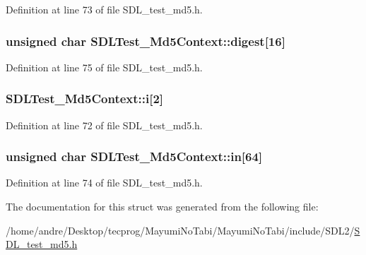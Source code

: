 Definition at line 73 of file S\-D\-L\-\_\-test\-\_\-md5.\-h.

\hypertarget{struct_s_d_l_test___md5_context_ab29079997a9f35e5d52c2aac3ad28f90}{
\subsubsection[{digest}]{\setlength{\rightskip}{0pt plus 5cm}unsigned char S\-D\-L\-Test\-\_\-\-Md5\-Context\-::digest\mbox{[}16\mbox{]}}}\label{struct_s_d_l_test___md5_context_ab29079997a9f35e5d52c2aac3ad28f90}


Definition at line 75 of file S\-D\-L\-\_\-test\-\_\-md5.\-h.

\hypertarget{struct_s_d_l_test___md5_context_a95b3d5fd74fd1b7a27bf96f3bb32beb4}{
\subsubsection[{i}]{ S\-D\-L\-Test\-\_\-\-Md5\-Context\-::i\mbox{[}2\mbox{]}}}\label{struct_s_d_l_test___md5_context_a95b3d5fd74fd1b7a27bf96f3bb32beb4}


Definition at line 72 of file S\-D\-L\-\_\-test\-\_\-md5.\-h.

\hypertarget{struct_s_d_l_test___md5_context_a337638ef799dc0ad9397ea9b175ea388}{
\subsubsection[{in}]{\setlength{\rightskip}{0pt plus 5cm}unsigned char S\-D\-L\-Test\-\_\-\-Md5\-Context\-::in\mbox{[}64\mbox{]}}}\label{struct_s_d_l_test___md5_context_a337638ef799dc0ad9397ea9b175ea388}


Definition at line 74 of file S\-D\-L\-\_\-test\-\_\-md5.\-h.



The documentation for this struct was generated from the following file\-:\begin{DoxyCompactItemize}
\item 
/home/andre/\-Desktop/tecprog/\-Mayumi\-No\-Tabi/\-Mayumi\-No\-Tabi/include/\-S\-D\-L2/\hyperlink{_s_d_l__test__md5_8h}{S\-D\-L\-\_\-test\-\_\-md5.\-h}\end{DoxyCompactItemize}
